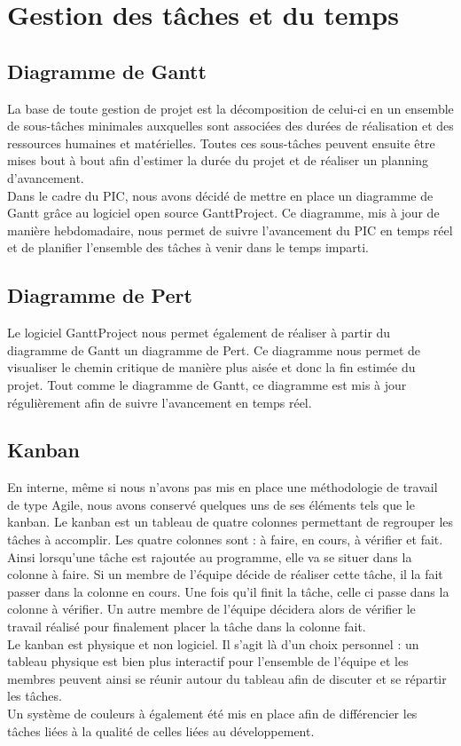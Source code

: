 \documentclass[asi]{picInsa}
\begin{document}
\section{Gestion des tâches et du temps}
\subsection{Diagramme de Gantt}
La base de toute gestion de projet est la décomposition de celui-ci en un ensemble de sous-tâches minimales auxquelles sont associées des durées de réalisation et des ressources humaines et matérielles. Toutes ces sous-tâches peuvent ensuite être mises bout à bout afin d'estimer la durée du projet et de réaliser un planning d'avancement.\\
Dans le cadre du PIC, nous avons décidé de mettre en place un diagramme de Gantt grâce au logiciel open source GanttProject. Ce diagramme, mis à jour de manière hebdomadaire, nous permet de suivre l'avancement du PIC en temps réel et de planifier l'ensemble des tâches à venir dans le temps imparti.

\subsection{Diagramme de Pert}
Le logiciel GanttProject nous permet également de réaliser à partir du diagramme de Gantt un diagramme de Pert. Ce diagramme nous permet de visualiser le chemin critique de manière plus aisée et donc la fin estimée du projet. Tout comme le diagramme de Gantt, ce diagramme est mis à jour régulièrement afin de suivre l'avancement en temps réel.

\subsection{Kanban}
En interne, même si nous n'avons pas mis en place une méthodologie de travail de type Agile, nous avons conservé quelques uns de ses éléments tels que le kanban. Le kanban est un tableau de quatre colonnes permettant de regrouper les tâches à accomplir. Les quatre colonnes sont : à faire, en cours, à vérifier et fait. Ainsi lorsqu'une tâche est rajoutée au programme, elle va se situer dans la colonne à faire. Si un membre de l'équipe décide de réaliser cette tâche, il la fait passer dans la colonne en cours. Une fois qu'il finit la tâche, celle ci passe dans la colonne à vérifier. Un autre membre de l'équipe décidera alors de vérifier le travail réalisé pour finalement placer la tâche dans la colonne fait.\\
Le kanban est physique et non logiciel. Il s'agit là d'un choix personnel : un tableau physique est bien plus interactif pour l'ensemble de l'équipe et les membres peuvent ainsi se réunir autour du tableau afin de discuter et se répartir les tâches.\\
Un système de couleurs à également été mis en place afin de différencier les tâches liées à la qualité de celles liées au développement.
\end{document}
